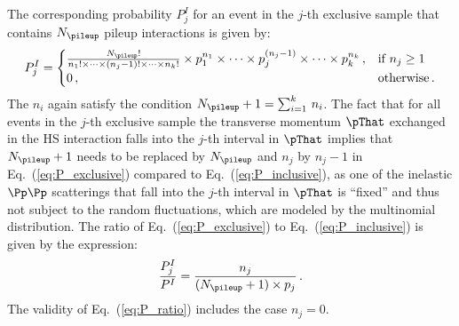 The corresponding probability $P_{j}^{I}$ for an event in the $j$-th exclusive sample that contains $N_{\pileup}$ pileup interactions is given by:
\begin{equation}
P_{j}^{I} = \begin{cases}
\frac{N_{\pileup}!}{n_{1}! \times \dots \times (n_{j} - 1)! \times \dots \times n_{k}!} \times p_{1}^{n_{1}} \times \dots \times p_{j}^{(n_{j} - 1)} \times \dots \times p_{k}^{n_{k}} \, ,
  & \text{if $n_{j} \geq 1$} \\
0 \, , & \text{otherwise} \, .
\end{cases}
\label{eq:P_exclusive}
\end{equation}
The $n_{i}$ again satisfy the condition $N_{\pileup} + 1 = \sum_{i=1}^{k} \, n_{i}$.
The fact that for all events in the $j$-th exclusive sample the transverse momentum $\pThat$ exchanged in the HS interaction falls into the $j$-th interval in $\pThat$
implies that $N_{\pileup} + 1$ needs to be replaced by $N_{\pileup}$ and $n_{j}$ by $n_{j} - 1$ in Eq.~(\ref{eq:P_exclusive}) compared to Eq.~(\ref{eq:P_inclusive}),
as one of the inelastic $\Pp\Pp$ scatterings that fall into the $j$-th interval in $\pThat$ is ``fixed'' and thus not subject to the random fluctuations, which are modeled by the multinomial distribution.
The ratio of Eq.~(\ref{eq:P_exclusive}) to Eq.~(\ref{eq:P_inclusive}) is given by the expression:
\begin{equation}
\frac{P_{j}^{I}}{P^{I}} = \frac{n_{j}}{(N_{\pileup} + 1) \times p_{j}} \, .
\label{eq:P_ratio}
\end{equation}
The validity of Eq.~(\ref{eq:P_ratio}) includes the case $n_{j} = 0$.

